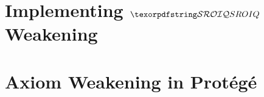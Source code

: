 \section{Implementing \texorpdfstring{$\SROIQ$}{SROIQ} Weakening}



\section{Axiom Weakening in Protégé}\label{protege}


